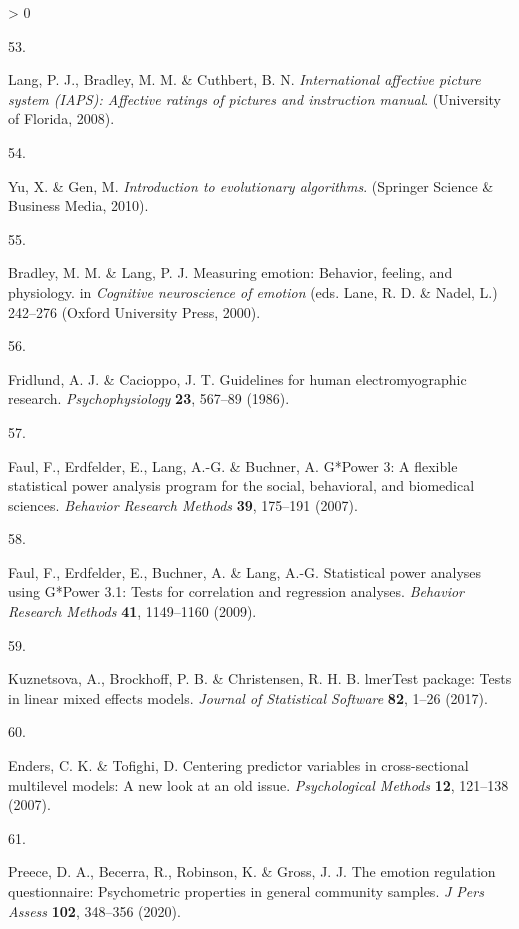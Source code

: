 \documentclass[
  english,
  man,floatsintext]{apa6}
\newlength{\cslhangindent}
\newlength{\csllabelwidth}
\newenvironment{CSLReferences}[2] %
 {%
  \setlength{\parindent}{0pt}
  \ifodd #1 \everypar{\setlength{\hangindent}{\cslhangindent}}\ignorespaces\fi
  \ifnum #2 > 0
  \setlength{\parskip}{#2\baselineskip}
  \fi
 }%
 {}
\newcommand{\CSLLeftMargin}[1]{\parbox[t]{\csllabelwidth}{#1}}
\newcommand{\CSLRightInline}[1]{\parbox[t]{\linewidth - \csllabelwidth}{#1}\break}
\begin{document}
\begin{CSLReferences}{0}{0}
\leavevmode\hypertarget{ref-Lang2008}{}%
\CSLLeftMargin{53. }
\CSLRightInline{Lang, P. J., Bradley, M. M. \& Cuthbert, B. N. \emph{International affective picture system (IAPS): Affective ratings of pictures and instruction manual}. (University of Florida, 2008).}

\leavevmode\hypertarget{ref-Yu2010}{}%
\CSLLeftMargin{54. }
\CSLRightInline{Yu, X. \& Gen, M. \emph{Introduction to evolutionary algorithms}. (Springer Science \& Business Media, 2010).}

\leavevmode\hypertarget{ref-Bradley2000}{}%
\CSLLeftMargin{55. }
\CSLRightInline{Bradley, M. M. \& Lang, P. J. Measuring emotion: Behavior, feeling, and physiology. in \emph{Cognitive neuroscience of emotion} (eds. Lane, R. D. \& Nadel, L.) 242--276 (Oxford University Press, 2000).}

\leavevmode\hypertarget{ref-Fridlund1986}{}%
\CSLLeftMargin{56. }
\CSLRightInline{Fridlund, A. J. \& Cacioppo, J. T. Guidelines for human electromyographic research. \emph{Psychophysiology} \textbf{23}, 567--89 (1986).}

\leavevmode\hypertarget{ref-Faul2007}{}%
\CSLLeftMargin{57. }
\CSLRightInline{Faul, F., Erdfelder, E., Lang, A.-G. \& Buchner, A. G*{Power} 3: {A} flexible statistical power analysis program for the social, behavioral, and biomedical sciences. \emph{Behavior Research Methods} \textbf{39}, 175--191 (2007).}

\leavevmode\hypertarget{ref-Faul2009}{}%
\CSLLeftMargin{58. }
\CSLRightInline{Faul, F., Erdfelder, E., Buchner, A. \& Lang, A.-G. Statistical power analyses using {G}*{Power} 3.1: {Tests} for correlation and regression analyses. \emph{Behavior Research Methods} \textbf{41}, 1149--1160 (2009).}

\leavevmode\hypertarget{ref-Kuznetsova2017}{}%
\CSLLeftMargin{59. }
\CSLRightInline{Kuznetsova, A., Brockhoff, P. B. \& Christensen, R. H. B. {lmerTest} package: Tests in linear mixed effects models. \emph{Journal of Statistical Software} \textbf{82}, 1--26 (2017).}

\leavevmode\hypertarget{ref-Enders2007}{}%
\CSLLeftMargin{60. }
\CSLRightInline{Enders, C. K. \& Tofighi, D. Centering predictor variables in cross-sectional multilevel models: {A} new look at an old issue. \emph{Psychological Methods} \textbf{12}, 121--138 (2007).}

\leavevmode\hypertarget{ref-Preece2020}{}%
\CSLLeftMargin{61. }
\CSLRightInline{Preece, D. A., Becerra, R., Robinson, K. \& Gross, J. J. The emotion regulation questionnaire: Psychometric properties in general community samples. \emph{J Pers Assess} \textbf{102}, 348--356 (2020).}


\end{CSLReferences}
\end{document}
